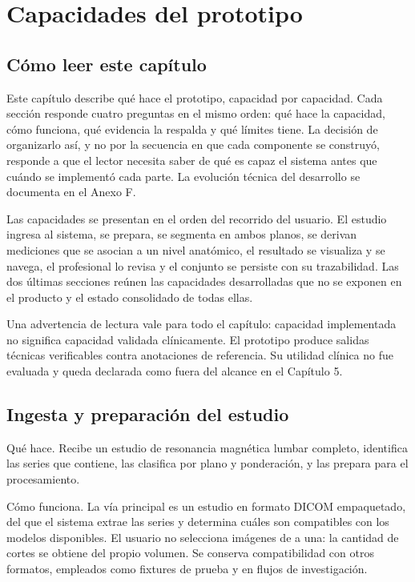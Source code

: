 \chapter{Capacidades del prototipo}
\label{chap:capacidades-prototipo}

\section{Cómo leer este capítulo}

Este capítulo describe qué hace el prototipo, capacidad por capacidad. Cada sección responde cuatro preguntas en el mismo orden: qué hace la capacidad, cómo funciona, qué evidencia la respalda y qué límites tiene. La decisión de organizarlo así, y no por la secuencia en que cada componente se construyó, responde a que el lector necesita saber de qué es capaz el sistema antes que cuándo se implementó cada parte. La evolución técnica del desarrollo se documenta en el Anexo F.

Las capacidades se presentan en el orden del recorrido del usuario. El estudio ingresa al sistema, se prepara, se segmenta en ambos planos, se derivan mediciones que se asocian a un nivel anatómico, el resultado se visualiza y se navega, el profesional lo revisa y el conjunto se persiste con su trazabilidad. Las dos últimas secciones reúnen las capacidades desarrolladas que no se exponen en el producto y el estado consolidado de todas ellas.

Una advertencia de lectura vale para todo el capítulo: capacidad implementada no significa capacidad validada clínicamente. El prototipo produce salidas técnicas verificables contra anotaciones de referencia. Su utilidad clínica no fue evaluada y queda declarada como fuera del alcance en el Capítulo 5.

\section{Ingesta y preparación del estudio}

Qué hace. Recibe un estudio de resonancia magnética lumbar completo, identifica las series que contiene, las clasifica por plano y ponderación, y las prepara para el procesamiento.

Cómo funciona. La vía principal es un estudio en formato DICOM empaquetado, del que el sistema extrae las series y determina cuáles son compatibles con los modelos disponibles. El usuario no selecciona imágenes de a una: la cantidad de cortes se obtiene del propio volumen. Se conserva compatibilidad con otros formatos, empleados como fixtures de prueba y en flujos de investigación.

